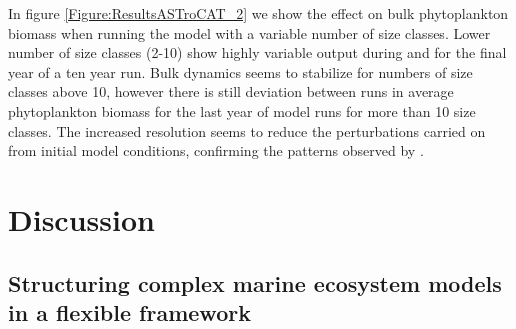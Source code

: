 \documentclass[journal abbreviation, manuscript]{copernicus}
\begin{document}
In figure \ref{Figure:ResultsASTroCAT_2} we show the effect on bulk phytoplankton biomass when running the model with a variable number of size classes. Lower number of size classes (2-10) show highly variable output during and for the final year of a ten year run. Bulk dynamics seems to stabilize for numbers of size classes above 10, however there is still deviation between runs in average phytoplankton biomass for the last year of model runs for more than 10 size classes. The increased resolution seems to reduce the perturbations carried on from initial model conditions, confirming the patterns observed by \citet{Baird2010IncreasingErrors}.


\section{Discussion}

\subsection{Structuring complex marine ecosystem models in a flexible framework}
\end{document}

